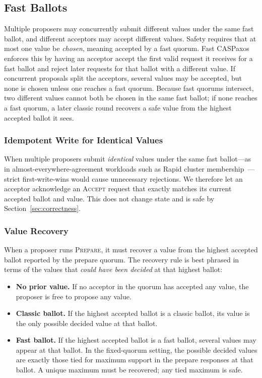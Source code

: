 \subsection{Fast Ballots}
\label{sec:fast-ballots}

Multiple proposers may concurrently submit different values under the same fast ballot, and different acceptors may accept different values.
Safety requires that at most one value be \emph{chosen}, meaning accepted by a fast quorum.
Fast CASPaxos enforces this by having an acceptor accept the first valid request it receives for a fast ballot and reject later requests for that ballot with a different value.
If concurrent proposals split the acceptors, several values may be accepted, but none is chosen unless one reaches a fast quorum.
Because fast quorums intersect, two different values cannot both be chosen in the same fast ballot; if none reaches a fast quorum, a later classic round recovers a safe value from the highest accepted ballot it sees.

\subsubsection{Idempotent Write for Identical Values}
When multiple proposers submit \emph{identical} values under the same fast ballot---as in almost-everywhere-agreement workloads such as Rapid cluster membership~\cite{suresh_atc18}---strict first-write-wins would cause unnecessary rejections.
We therefore let an acceptor acknowledge an \textsc{Accept} request that exactly matches its current accepted ballot and value.
This does not change state and is safe by Section~\ref{sec:correctness}.

\subsubsection{Value Recovery}
\label{sec:value-recovery}
When a proposer runs \textsc{Prepare}, it must recover a value from the highest accepted ballot reported by the prepare quorum.
The recovery rule is best phrased in terms of the values that \emph{could have been decided} at that highest ballot:

\begin{itemize}
    \item \textbf{No prior value.} If no acceptor in the quorum has accepted any value, the proposer is free to propose any value.
    \item \textbf{Classic ballot.} If the highest accepted ballot is a classic ballot, its value is the only possible decided value at that ballot.
    \item \textbf{Fast ballot.} If the highest accepted ballot is a fast ballot, several values may appear at that ballot. In the fixed-quorum setting, the possible decided values are exactly those tied for maximum support in the prepare responses at that ballot. A unique maximum must be recovered; any tied maximum is safe.
\end{itemize}

